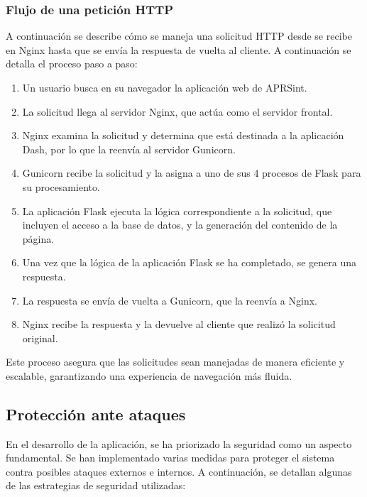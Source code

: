 \subsubsection*{Flujo de una petición HTTP}

A continuación se describe cómo se maneja una solicitud HTTP desde se recibe en Nginx hasta que se envía la respuesta de vuelta al cliente. A continuación se detalla el proceso paso a paso:

\begin{enumerate}
	\item Un usuario busca en su navegador la aplicación web de APRSint.
	\item La solicitud llega al servidor Nginx, que actúa como el servidor frontal.
	\item Nginx examina la solicitud y determina que está destinada a la aplicación Dash, por lo que la reenvía al servidor Gunicorn.
	\item Gunicorn recibe la solicitud y la asigna a uno de sus 4 procesos de Flask para su procesamiento.
	\item La aplicación Flask ejecuta la lógica correspondiente a la solicitud, que incluyen el acceso a la base de datos, y la generación del contenido de la página.
	\item Una vez que la lógica de la aplicación Flask se ha completado, se genera una respuesta.
	\item La respuesta se envía de vuelta a Gunicorn, que la reenvía a Nginx.
	\item Nginx recibe la respuesta y la devuelve al cliente que realizó la solicitud original.
\end{enumerate}

Este proceso asegura que las solicitudes sean manejadas de manera eficiente y escalable, garantizando una experiencia de navegación más fluida.

\subsection*{Protección ante ataques}

En el desarrollo de la aplicación, se ha priorizado la seguridad como un aspecto fundamental. Se han implementado varias medidas para proteger el sistema contra posibles ataques externos e internos. A continuación, se detallan algunas de las estrategias de seguridad utilizadas:

